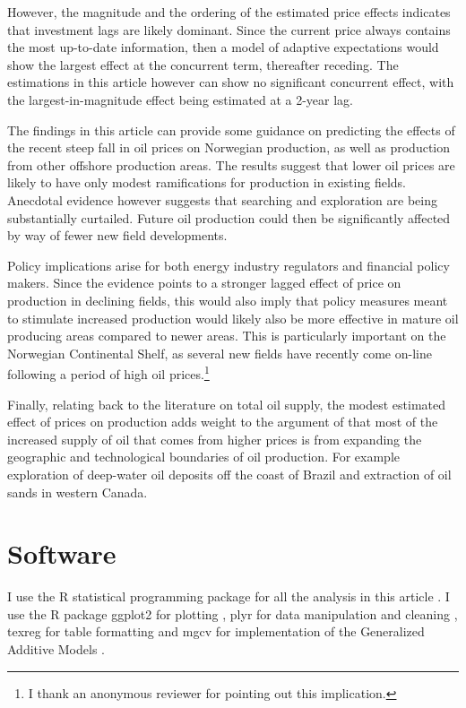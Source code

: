 \documentclass[12pt]{article}
\begin{document}
However, the magnitude and the ordering of the estimated price effects indicates that investment lags are likely dominant. Since the current price always contains the most up-to-date information, then a model of adaptive expectations would show the largest effect at the concurrent term, thereafter receding. The estimations in this article however can show no significant concurrent effect, with the largest-in-magnitude effect being estimated at a 2-year lag.

The findings in this article can provide some guidance on predicting the effects of the recent steep fall in oil prices on Norwegian production, as well as production from other offshore production areas. The results suggest that lower oil prices are likely to have only modest ramifications for production in existing fields.  Anecdotal evidence however suggests that searching and exploration are being substantially curtailed. Future oil production could then be significantly affected by way of fewer new field developments.

Policy implications arise for both energy industry regulators and financial policy makers. Since the evidence points to a stronger lagged effect of price on production in declining fields, this would also imply that policy measures meant to stimulate increased production would likely also be more effective in mature oil producing areas compared to newer areas. This is particularly important on the Norwegian Continental Shelf, as several new fields have recently come on-line following a period of high oil prices.\footnote{I thank an anonymous reviewer for pointing out this implication.}

Finally, relating back to the literature on total oil supply, the modest estimated effect of prices on production adds weight to the argument of \citet{hamilton_oil_2012} that most of the increased supply of oil that comes from higher prices is from expanding the geographic and technological boundaries of oil production.  For example exploration of deep-water oil deposits off the coast of Brazil and extraction of oil sands in western Canada.

\FloatBarrier
\section{Software}
I use the R statistical programming package for all the analysis in this article \citep{r_core_team_r:_2013}.  I use the R package ggplot2 for plotting \citep{wickham_ggplot2:_2009}, plyr for data manipulation and cleaning \citep{wickham_split-apply-combine_2011}, texreg for table formatting \citep{leifeld_texreg:_2013} and mgcv for implementation of the Generalized Additive Models \citep{wood_fast_2011}.
\end{document}
